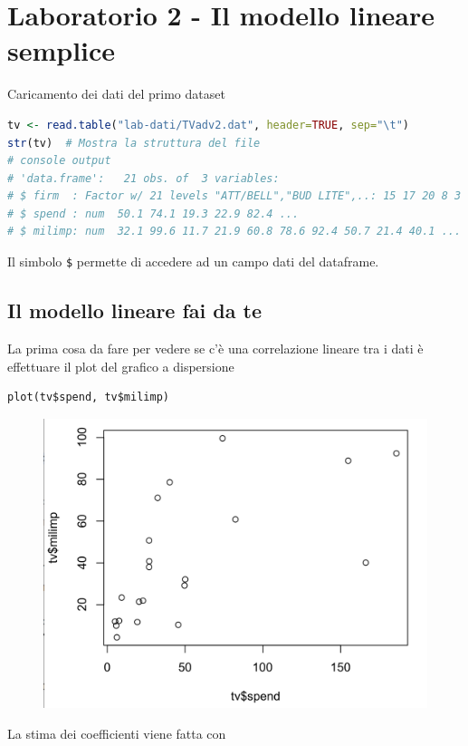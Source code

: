 
\section{Laboratorio 2 - Il modello lineare semplice}

Caricamento dei dati del primo dataset

\begin{lstlisting}[language=R]
tv <- read.table("lab-dati/TVadv2.dat", header=TRUE, sep="\t")
str(tv)  # Mostra la struttura del file
# console output
# 'data.frame':   21 obs. of  3 variables:
# $ firm  : Factor w/ 21 levels "ATT/BELL","BUD LITE",..: 15 17 20 8 3 5 12 13 7 9 ...
# $ spend : num  50.1 74.1 19.3 22.9 82.4 ...
# $ milimp: num  32.1 99.6 11.7 21.9 60.8 78.6 92.4 50.7 21.4 40.1 ...
\end{lstlisting}

Il simbolo \texttt{\$} permette di accedere ad un campo dati del dataframe.

\subsection{Il modello lineare fai da te}

La prima cosa da fare per vedere se c'è una correlazione lineare tra i dati è effettuare il plot del grafico a dispersione

\begin{lstlisting}
plot(tv$spend, tv$milimp) 
\end{lstlisting}

\begin{figure}
	\centering
	\includegraphics[width=.6\textwidth]{./notes/immagini/l9-fig1.png}
\end{figure}

La stima dei coefficienti viene fatta con

